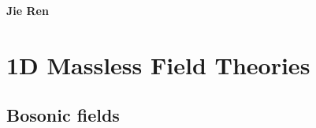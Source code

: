 \documentclass{SciPost}
\begin{document}
\pagestyle{SPstyle}

\begin{center}{\Large \textbf{\color{scipostdeepblue}{
Bosonization\\
}}}\end{center}

\begin{center}
\textbf{Jie Ren}
\end{center}

\tableofcontents

\section{1D Massless Field Theories}

\subsection{Bosonic fields}
\end{document}
